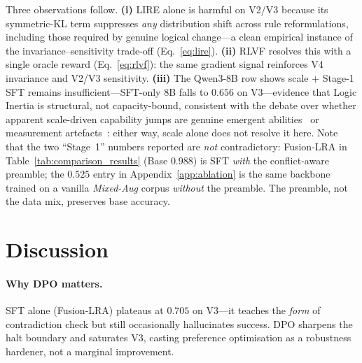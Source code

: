 \documentclass{article}
\begin{document}
Three observations follow. \textbf{(i)} LIRE alone is harmful on V2/V3 because its symmetric-KL term suppresses \emph{any} distribution shift across rule reformulations, including those required by genuine logical change---a clean empirical instance of the invariance--sensitivity trade-off (Eq.~\ref{eq:lire}). \textbf{(ii)} RLVF resolves this with a single oracle reward (Eq.~\ref{eq:rlvf}): the same gradient signal reinforces V4 invariance and V2/V3 sensitivity. \textbf{(iii)} The Qwen3-8B row shows scale + Stage-1 SFT remains insufficient---SFT-only $8$B falls to $0.656$ on V3---evidence that Logic Inertia is structural, not capacity-bound, consistent with the debate over whether apparent scale-driven capability jumps are genuine emergent abilities~\citep{wei2022emergent} or measurement artefacts~\citep{schaeffer2023mirage}: either way, scale alone does not resolve it here. Note that the two ``Stage~1'' numbers reported are \emph{not} contradictory: Fusion-LRA in Table~\ref{tab:comparison_results} (Base $0.988$) is SFT \emph{with} the conflict-aware preamble; the $0.525$ entry in Appendix~\ref{app:ablation} is the same backbone trained on a vanilla \emph{Mixed-Aug} corpus \emph{without} the preamble. The preamble, not the data mix, preserves base accuracy.

\section{Discussion}

\paragraph{Why DPO matters.} SFT alone (Fusion-LRA) plateaus at $0.705$ on V3---it teaches the \emph{form} of contradiction check but still occasionally hallucinates success. DPO sharpens the halt boundary and saturates V3, casting preference optimisation as a robustness hardener, not a marginal improvement.
\end{document}

